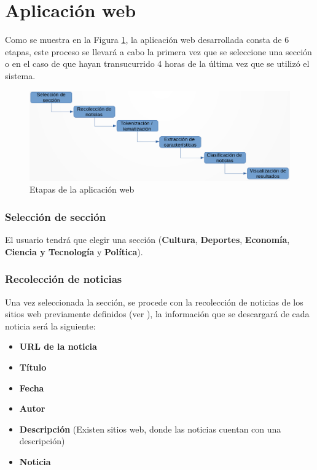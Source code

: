 \section{Aplicación web}

Como se muestra en la Figura \ref{fig:procesoAppWeb}, la aplicación web desarrollada consta de 6 etapas, este proceso se llevará a cabo la primera vez que se seleccione una sección o en el caso de que hayan transucurrido 4 horas de la última vez que se utilizó el sistema.
\\

\begin{figure}[H]
	\centering
	\includegraphics[scale=0.3]{imagenes/Capitulo5/procesoRecoleccionClasificacion.png}
	\caption{Etapas de la aplicación web}
	\label{fig:procesoAppWeb}
\end{figure}

\subsubsection{Selección de sección}
El usuario tendrá que elegir una sección (\textbf{Cultura}, \textbf{Deportes}, \textbf{Economía}, \textbf{Ciencia y Tecnología} y \textbf{Política}). 
\\

\subsubsection{Recolección de noticias}
Una vez seleccionada la sección, se procede con la recolección de noticias de los sitios web previamente definidos (ver ), la información que se descargará de cada noticia será la siguiente:

\begin{itemize}
	\item \textbf{URL de la noticia}
	\item \textbf{Título}
	\item \textbf{Fecha}
	\item \textbf{Autor}
	\item \textbf{Descripción} (Existen sitios web, donde las noticias cuentan con una descripción)
	\item \textbf{Noticia}
\end{itemize}

